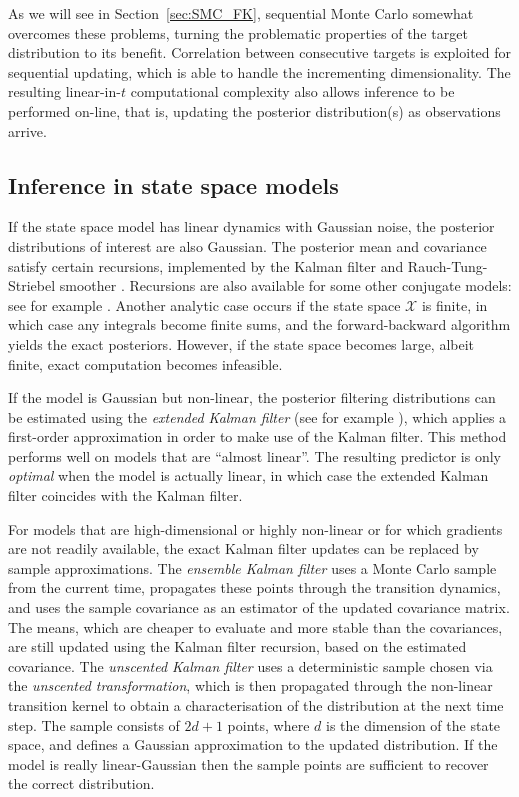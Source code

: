 As we will see in Section~\ref{sec:SMC_FK}, sequential Monte Carlo somewhat overcomes these problems, turning the problematic properties of the target distribution to its benefit. Correlation between consecutive targets is exploited for sequential updating, which is able to handle the incrementing dimensionality. The resulting linear-in-$t$ computational complexity also allows inference to be performed on-line, that is, updating the posterior distribution(s) as observations arrive.




\subsection{Inference in state space models}
\label{sec:SSM_exact_inference}
If the state space model has linear dynamics with Gaussian noise, the posterior distributions of interest are also Gaussian. The posterior mean and covariance satisfy certain recursions, implemented by the Kalman filter \parencite{kalman1960} and Rauch-Tung-Striebel smoother \parencite{rauch1965}. 
Recursions are also available for some other conjugate models: see for example \textcite{vidoni1999,king2021}.
Another analytic case occurs if the state space $\mathcal{X}$ is finite, in which case any integrals become finite sums, and the forward-backward algorithm \parencite{baum1970} yields the exact posteriors. However, if the state space becomes large, albeit finite, exact computation becomes infeasible.

If the model is Gaussian but non-linear, the posterior filtering distributions can be estimated using the \emph{extended Kalman filter} (see for example \textcite{jazwinski2007}), which applies a first-order approximation in order to make use of the Kalman filter. This method performs well on models that are ``almost linear''. The resulting predictor is only \emph{optimal} when the model is actually linear, in which case the extended Kalman filter coincides with the Kalman filter.

For models that are high-dimensional or highly non-linear or for which gradients are not readily available, the exact Kalman filter updates can be replaced by sample approximations.
The \emph{ensemble Kalman filter} \parencite{evensen1994} uses a Monte Carlo sample from the current time, propagates these points through the transition dynamics, and uses the sample covariance as an estimator of the updated covariance matrix. The means, which are cheaper to evaluate and more stable than the covariances, are still updated using the Kalman filter recursion, based on the estimated covariance.
The \emph{unscented Kalman filter} \parencite{wan2000} uses a deterministic sample chosen via the \emph{unscented transformation}, which is then propagated through the non-linear transition kernel to obtain a characterisation of the distribution at the next time step. The sample consists of $2d+1$ points, where $d$ is the dimension of the state space, and defines a Gaussian approximation to the updated distribution. If the model is really linear-Gaussian then the sample points are sufficient to recover the correct distribution.

